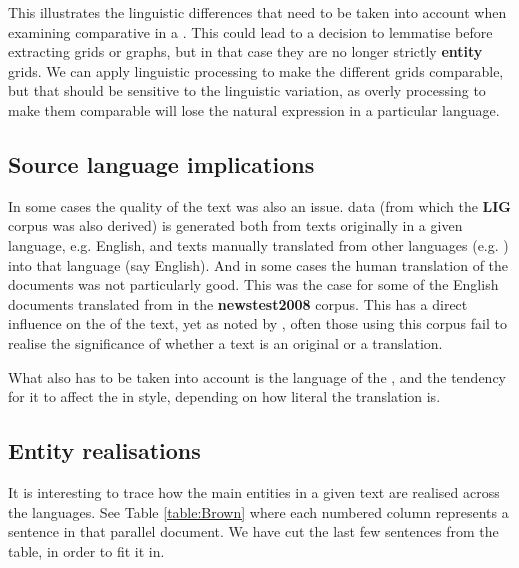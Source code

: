 \documentclass[output=paper]{langsci/langscibook.cls}
\begin{document}
This illustrates the linguistic differences that need to be taken into account when examining comparative  in a . This could lead to a decision to lemmatise before extracting grids or graphs, but in that case they are no longer strictly {\bf entity} grids. We can apply linguistic processing to make the different grids comparable, but that should be sensitive to the linguistic variation, as overly processing to make them comparable will lose the natural expression in a particular language.

\subsection{Source language implications}
In some cases the quality of the text was also an issue.  data (from which the {\bf LIG} corpus was also derived) is generated both from texts originally in a given language, e.g. English, and texts manually translated from other languages (e.g. ) into that language (say English). And in some cases the human translation of the documents was not particularly good. This was the case for some of the English documents translated from  in the {\bf newstest2008} corpus. This has a direct influence on the  of the text, yet as noted by \citet{Cartoni}, often those using this  corpus fail to realise the significance of whether a text is an original or a translation.

What also has to be taken into account is the language of the , and the tendency for it to affect the  in style, depending on how literal the translation is. 

\subsection{Entity realisations}
It is interesting to trace how the main entities in a given text are realised across the languages. See Table \ref{table:Brown} where each numbered column represents a sentence in that parallel document. We have cut the last few sentences from the table, in order to fit it in.
\end{document}
